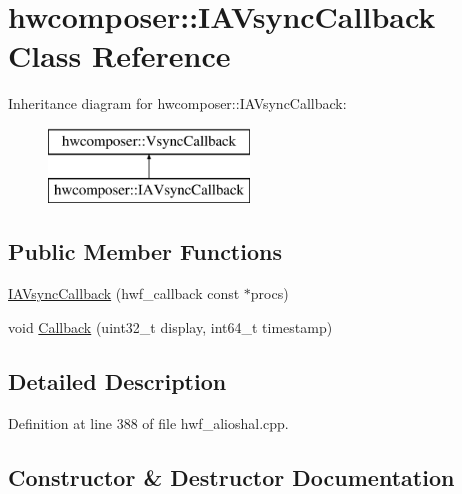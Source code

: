 \hypertarget{classhwcomposer_1_1IAVsyncCallback}{}\section{hwcomposer\+:\+:I\+A\+Vsync\+Callback Class Reference}
\label{classhwcomposer_1_1IAVsyncCallback}
Inheritance diagram for hwcomposer\+:\+:I\+A\+Vsync\+Callback\+:\begin{figure}[H]
\begin{center}
\leavevmode
\includegraphics[height=2.000000cm]{classhwcomposer_1_1IAVsyncCallback}
\end{center}
\end{figure}
\subsection*{Public Member Functions}
\begin{DoxyCompactItemize}
\item 
\mbox{\hyperlink{classhwcomposer_1_1IAVsyncCallback_afdf960ef784e276e17e6d0775b2c9142}{I\+A\+Vsync\+Callback}} (hwf\+\_\+callback const $\ast$procs)
\item 
void \mbox{\hyperlink{classhwcomposer_1_1IAVsyncCallback_a9ccc6eb6a50d308473716a225e320c8d}{Callback}} (uint32\+\_\+t display, int64\+\_\+t timestamp)
\end{DoxyCompactItemize}


\subsection{Detailed Description}


Definition at line 388 of file hwf\+\_\+alioshal.\+cpp.



\subsection{Constructor \& Destructor Documentation}
\mbox{\label{classhwcomposer_1_1IAVsyncCallback_afdf960ef784e276e17e6d0775b2c9142}} 
